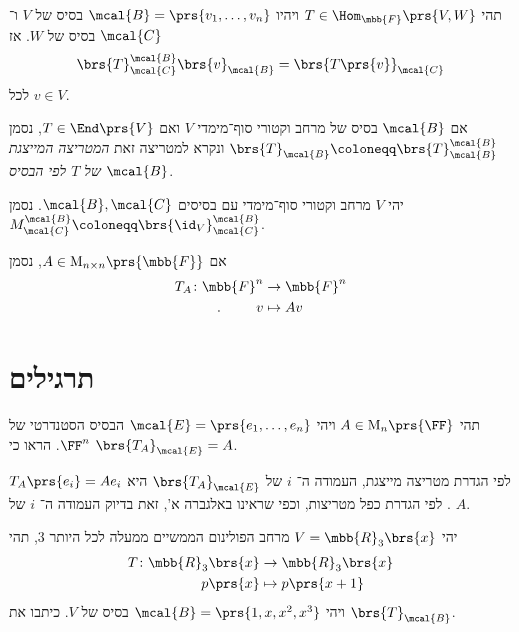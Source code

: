 \documentclass[a4paper,10pt,twoside,openany]{book}
\renewcommand{\Mat}{\mathrm{M}}
\begin{document}
\begin{proposition}
תהי
$T \in \Hom_{\mbb{F}}\prs{V,W}$
ויהיו
$\mcal{B} = \prs{v_1, \ldots, v_n}$
בסיס של
$V$
ו־%
$\mcal{C}$
בסיס של
$W$.
אז
\[\brs{T}^\mcal{B}_\mcal{C} \brs{v}_\mcal{B} = \brs{T\prs{v}}_\mcal{C}\]
לכל
$v \in V$.
\end{proposition}

\begin{notation}
אם
$\mcal{B}$
בסיס של מרחב וקטורי סוף־מימדי
$V$
ואם
$T \in \End\prs{V}$,
נסמן
$\brs{T}_\mcal{B} \coloneqq \brs{T}^\mcal{B}_\mcal{B}$
ונקרא למטריצה זאת
\emph{המטריצה המייצגת של
$T$
לפי הבסיס
$\mcal{B}$}.
\end{notation}

\begin{notation}
יהי
$V$
מרחב וקטורי סוף־מימדי עם בסיסים
$\mcal{B},\mcal{C}$.
נסמן
$M^\mcal{B}_\mcal{C} \coloneqq \brs{\id_V}^\mcal{B}_\mcal{C}$.
\end{notation}

\begin{notation}
אם
$A \in \Mat_{n\times n}\prs{\mbb{F}}$,
נסמן
\begin{align*}
T_A \colon \mbb{F}^n &\to \mbb{F}^n \\
\text{.} \hphantom{lalala} v &\mapsto Av
\end{align*}
\end{notation}

\section{תרגילים}

\begin{exercisechap}
תהי
$A \in \Mat_n\prs{\FF}$
ויהי
$\mcal{E} = \prs{e_1, \ldots, e_n}$
הבסיס הסטנדרטי של
$\FF^n$.
הראו כי
$\brs{T_A}_{\mcal{E}} = A$.
\end{exercisechap}

\begin{solution}
לפי הגדרת מטריצה מייצגת, העמודה ה־%
$i$
של
$\brs{T_A}_{\mcal{E}}$
היא
$T_A \prs{e_i} = A e_i$.
לפי הגדרת כפל מטריצות, וכפי שראינו באלגברה א', זאת בדיוק העמודה ה־%
$i$
של
$A$.
\end{solution}

\begin{exercisechap}\label{ex:p(x+1)}
יהי
$V = \mbb{R}_3\brs{x}$
מרחב הפולינום הממשיים ממעלה לכל היותר
$3$,
תהי
\begin{align*}
T \colon \mbb{R}_3\brs{x} &\to \mbb{R}_3\brs{x} \\
p\prs{x} &\mapsto p\prs{x+1}
\end{align*}
ויהי
$\mcal{B} = \prs{1,x,x^2,x^3}$
בסיס של
$V$.
כיתבו את
$\brs{T}_\mcal{B}$.
\end{exercisechap}
\end{document}
